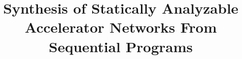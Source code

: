 \documentclass{sig-alternate}
\begin{document}
%

\title{Synthesis of Statically Analyzable Accelerator Networks From Sequential Programs}
%
%
%
%
%
\end{document}
